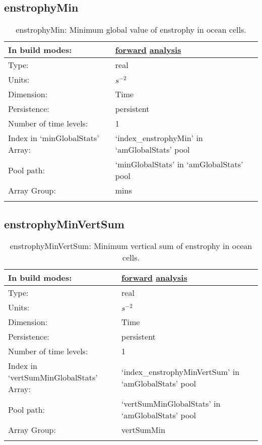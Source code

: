 \subsection[enstrophyMin]{enstrophyMin}
\label{subsec:var_sec_amGlobalStats_enstrophyMin}
\begin{center}
\begin{longtable}{| p{2.0in} | p{4.0in} |}
        \hline 
        In build modes: & \hyperref[subsec:forward_var_tab_amGlobalStats]{forward} \hyperref[subsec:analysis_var_tab_amGlobalStats]{analysis} \\
        \hline 
        Type: & real \\
        \hline 
        Units: & $s^{-2}$ \\
        \hline 
        Dimension: & Time \\
        \hline 
        Persistence: & persistent \\
        \hline 
        Number of time levels: & 1 \\
        \hline 
		 Index in `minGlobalStats' Array: & `index\_enstrophyMin' in `amGlobalStats' pool \\
		 \hline 
            Pool path: & `minGlobalStats' in `amGlobalStats' pool \\
		 \hline 
		 Array Group: & mins \\
		 \hline 
    \caption{enstrophyMin: Minimum global value of enstrophy in ocean cells.}
\end{longtable}
\end{center}
\subsection[enstrophyMinVertSum]{enstrophyMinVertSum}
\label{subsec:var_sec_amGlobalStats_enstrophyMinVertSum}
\begin{center}
\begin{longtable}{| p{2.0in} | p{4.0in} |}
        \hline 
        In build modes: & \hyperref[subsec:forward_var_tab_amGlobalStats]{forward} \hyperref[subsec:analysis_var_tab_amGlobalStats]{analysis} \\
        \hline 
        Type: & real \\
        \hline 
        Units: & $s^{-2}$ \\
        \hline 
        Dimension: & Time \\
        \hline 
        Persistence: & persistent \\
        \hline 
        Number of time levels: & 1 \\
        \hline 
		 Index in `vertSumMinGlobalStats' Array: & `index\_enstrophyMinVertSum' in `amGlobalStats' pool \\
		 \hline 
            Pool path: & `vertSumMinGlobalStats' in `amGlobalStats' pool \\
		 \hline 
		 Array Group: & vertSumMin \\
		 \hline 
    \caption{enstrophyMinVertSum: Minimum vertical sum of enstrophy in ocean cells.}
\end{longtable}
\end{center}
